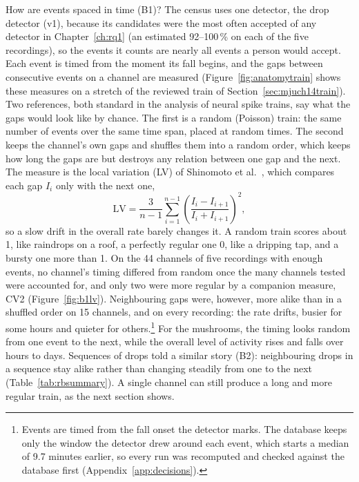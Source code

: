How are events spaced in time (B1)? The census uses one detector, the drop detector (v1), because its candidates were the most often accepted of any detector in Chapter~\ref{ch:rq1} (an estimated 92--100\,\% on each of the five recordings), so the events it counts are nearly all events a person would accept. Each event is timed from the moment its fall begins, and the gaps between consecutive events on a channel are measured (Figure~\ref{fig:anatomytrain} shows these measures on a stretch of the reviewed train of Section~\ref{sec:mjuch14train}). Two references, both standard in the analysis of neural spike trains, say what the gaps would look like by chance. The first is a random (Poisson) train: the same number of events over the same time span, placed at random times. The second keeps the channel's own gaps and shuffles them into a random order, which keeps how long the gaps are but destroys any relation between one gap and the next. The measure is the local variation (LV) of Shinomoto et al.\ \cite{shinomoto2003lv}, which compares each gap $I_i$ only with the next one,
\[ \mathrm{LV} = \frac{3}{n-1}\sum_{i=1}^{n-1}\left(\frac{I_i - I_{i+1}}{I_i + I_{i+1}}\right)^{2}, \]
so a slow drift in the overall rate barely changes it. A random train scores about 1, like raindrops on a roof, a perfectly regular one 0, like a dripping tap, and a bursty one more than 1. On the 44 channels of five recordings with enough events, no channel's timing differed from random once the many channels tested were accounted for, and only two were more regular by a companion measure, CV2 (Figure~\ref{fig:b1lv}). Neighbouring gaps were, however, more alike than in a shuffled order on 15 channels, and on every recording: the rate drifts, busier for some hours and quieter for others.\footnote{Events are timed from the fall onset the detector marks. The database keeps only the window the detector drew around each event, which starts a median of 9.7 minutes earlier, so every run was recomputed and checked against the database first (Appendix~\ref{app:decisions}).} For the mushrooms, the timing looks random from one event to the next, while the overall level of activity rises and falls over hours to days. Sequences of drops told a similar story (B2): neighbouring drops in a sequence stay alike rather than changing steadily from one to the next (Table~\ref{tab:rbsummary}). A single channel can still produce a long and more regular train, as the next section shows.

